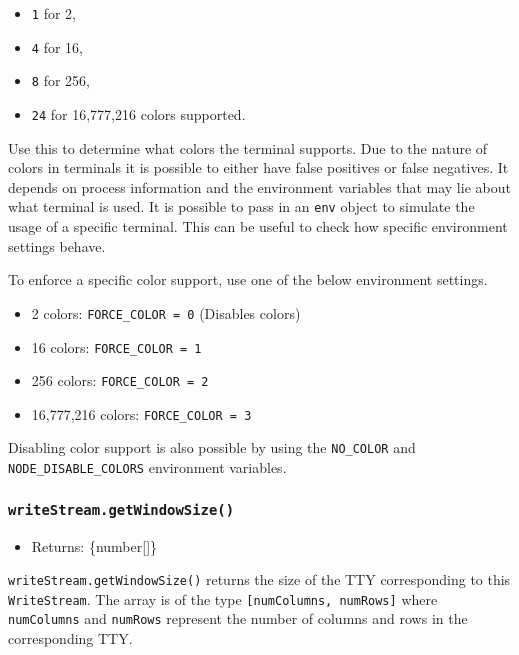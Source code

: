 \begin{itemize}
\tightlist
\item
  \texttt{1} for 2,
\item
  \texttt{4} for 16,
\item
  \texttt{8} for 256,
\item
  \texttt{24} for 16,777,216 colors supported.
\end{itemize}

Use this to determine what colors the terminal supports. Due to the
nature of colors in terminals it is possible to either have false
positives or false negatives. It depends on process information and the
environment variables that may lie about what terminal is used. It is
possible to pass in an \texttt{env} object to simulate the usage of a
specific terminal. This can be useful to check how specific environment
settings behave.

To enforce a specific color support, use one of the below environment
settings.

\begin{itemize}
\tightlist
\item
  2 colors: \texttt{FORCE\_COLOR\ =\ 0} (Disables colors)
\item
  16 colors: \texttt{FORCE\_COLOR\ =\ 1}
\item
  256 colors: \texttt{FORCE\_COLOR\ =\ 2}
\item
  16,777,216 colors: \texttt{FORCE\_COLOR\ =\ 3}
\end{itemize}

Disabling color support is also possible by using the \texttt{NO\_COLOR}
and \texttt{NODE\_DISABLE\_COLORS} environment variables.

\subsubsection{\texorpdfstring{\texttt{writeStream.getWindowSize()}}{writeStream.getWindowSize()}}\label{writestream.getwindowsize}

\begin{itemize}
\tightlist
\item
  Returns: \{number{[}{]}\}
\end{itemize}

\texttt{writeStream.getWindowSize()} returns the size of the TTY
corresponding to this \texttt{WriteStream}. The array is of the type
\texttt{{[}numColumns,\ numRows{]}} where \texttt{numColumns} and
\texttt{numRows} represent the number of columns and rows in the
corresponding TTY.

